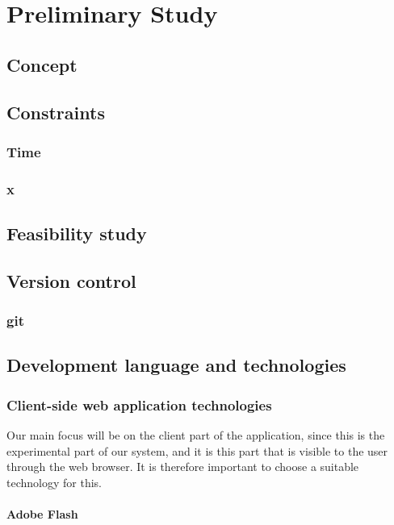 \chapter{Preliminary Study}

\section{Concept}

\section{Constraints}
\subsection{Time}
\subsection{x}

\section{Feasibility study}

\section{Version control}
\subsection{git}

\section{Development language and technologies}


\subsection{Client-side web application technologies}
Our main focus will be on the client part of the application, since this is the experimental part of our system, and it is this part that is visible to the user through the web browser. It is therefore important to choose a suitable technology for this.

\subsubsection{Adobe Flash}

